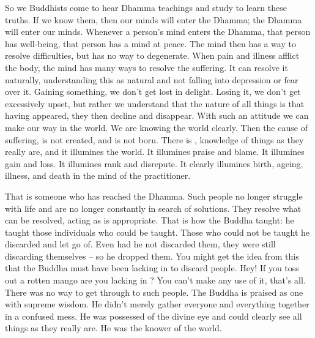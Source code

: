 So we Buddhists come to hear Dhamma teachings and study to learn these truths. If we know them, then our minds will enter the Dhamma; the Dhamma will enter our minds. Whenever a person's mind enters the Dhamma, that person has well-being, that person has a mind at peace. The mind then has a way to resolve difficulties, but has no way to degenerate. When pain and illness afflict the body, the mind has many ways to resolve the suffering. It can resolve it naturally, understanding this as natural and not falling into depression or fear over it. Gaining something, we don't get lost in delight. Losing it, we don't get excessively upset, but rather we understand that the nature of all things is that having appeared, they then decline and disappear. With such an attitude we can make our way in the world. We are  knowing the world clearly. Then  the cause of suffering, is not created, and  is not born. There is , knowledge of things as they really are, and it illumines the world. It illumines praise and blame. It illumines gain and loss. It illumines rank and disrepute. It clearly illumines birth, ageing, illness, and death in the mind of the practitioner.

That is someone who has reached the Dhamma. Such people no longer struggle with life and are no longer constantly in search of solutions. They resolve what can be resolved, acting as is appropriate. That is how the Buddha taught: he taught those individuals who could be taught. Those who could not be taught he discarded and let go of. Even had he not discarded them, they were still discarding themselves -- so he dropped them. You might get the idea from this that the Buddha must have been lacking in  to discard people. Hey! If you toss out a rotten mango are you lacking in ? You can't make any use of it, that's all. There was no way to get through to such people. The Buddha is praised as one with supreme wisdom. He didn't merely gather everyone and everything together in a confused mess. He was possessed of the divine eye and could clearly see all things as they really are. He was the knower of the world.

